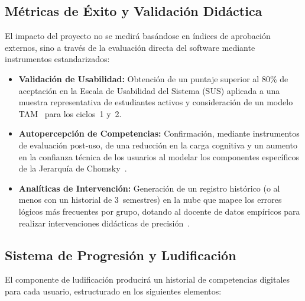 \subsection{Métricas de Éxito y Validación Didáctica}
\label{ssec:metricas}

El impacto del proyecto no se medirá basándose en índices de aprobación externos, sino a
través de la evaluación directa del software mediante instrumentos estandarizados:

\begin{itemize}
    \item \textbf{Validación de Usabilidad:} Obtención de un puntaje superior al 80\% de
        aceptación en la Escala de Usabilidad del Sistema (SUS) aplicada a una muestra
        representativa de estudiantes activos y consideración de un modelo TAM~\cite{brooke1996}
        para los ciclos~1 y~2.

    \item \textbf{Autopercepción de Competencias:} Confirmación, mediante instrumentos de
        evaluación post-uso, de una reducción en la carga cognitiva y un aumento en la
        confianza técnica de los usuarios al modelar los componentes específicos de la
        Jerarquía de Chomsky~\cite{hopcroft2007, sweller1988}.

    \item \textbf{Analíticas de Intervención:} Generación de un registro histórico (o al
        menos con un historial de 3~semestres) en la nube que mapee los errores lógicos más
        frecuentes por grupo, dotando al docente de datos empíricos para realizar
        intervenciones didácticas de precisión~\cite{felder2016}.
\end{itemize}

\subsection{Sistema de Progresión y Ludificación}
\label{ssec:ludificacion}

El componente de ludificación producirá un historial de competencias digitales para cada
usuario, estructurado en los siguientes elementos:

